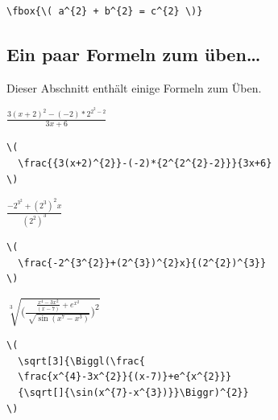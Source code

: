 \documentclass[a4paper,10pt,twoside]{scrbook}
\begin{document}
{\begin{minipage}[c]{.38\textwidth}
\setlength{\parskip}{1em}
\centering
{}
\end{minipage}
\hfill
\begin{minipage}[c]{.6\textwidth}
\setlength{\parskip}{1em}
\begin{lstlisting}[label=fboxbeispiel, style=customlatex]
\fbox{\( a^{2} + b^{2} = c^{2} \)}
\end{lstlisting}
\end{minipage}


\subsection{Ein paar Formeln zum üben\dots}


Dieser Abschnitt enthält einige Formeln zum Üben. 

\begin{minipage}[c]{.38\textwidth}
\setlength{\parskip}{1em}
\centering
\(
  \frac{{3(x+2)^{2}}-(-2)*{2^{2^{2}-2}}}{3x+6} 
\)
\end{minipage}
\hfill
\begin{minipage}[c]{.6\textwidth}
\setlength{\parskip}{1em}
\begin{lstlisting}[label=formelbeispiel1, style=customlatex]
\(
  \frac{{3(x+2)^{2}}-(-2)*{2^{2^{2}-2}}}{3x+6} 
\)
\end{lstlisting}
\end{minipage}

\begin{minipage}[c]{.38\textwidth}
\setlength{\parskip}{1em}
\centering
\(
  \frac{-2^{3^{2}}+(2^{3})^{2}x}{(2^{2})^{3}} 
\)
\end{minipage}
\hfill
\begin{minipage}[c]{.6\textwidth}
\setlength{\parskip}{1em}
\begin{lstlisting}[label=formelbeispiel2, style=customlatex]
\(
  \frac{-2^{3^{2}}+(2^{3})^{2}x}{(2^{2})^{3}} 
\)
\end{lstlisting}
\end{minipage}

\begin{minipage}[c]{.38\textwidth}
\setlength{\parskip}{1em}
\centering
\(
  \sqrt[3]{\Biggl(\frac{
  \frac{x^{4}-3x^{2}}{(x-7)}+e^{x^{2}}} 
  {\sqrt[]{\sin(x^{7}-x^{3})}}\Biggr)^{2}} 
\)
\end{minipage}
\hfill
\begin{minipage}[c]{.6\textwidth}
\setlength{\parskip}{1em}
\begin{lstlisting}[label=formelbeispiel3, style=customlatex]
\(
  \sqrt[3]{\Biggl(\frac{
  \frac{x^{4}-3x^{2}}{(x-7)}+e^{x^{2}}} 
  {\sqrt[]{\sin(x^{7}-x^{3})}}\Biggr)^{2}} 
\)
\end{lstlisting}
\end{minipage}


}
\end{document}
